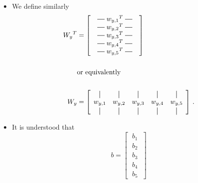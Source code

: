 \documentclass{article}
\newcommand*{\vertbar}{\rule[-1ex]{0.5pt}{2.5ex}}
\newcommand*{\horzbar}{\rule[.5ex]{2.5ex}{0.5pt}}
\begin{document}
\begin{itemize}
  \item We define similarly
    \begin{align*}
      {W_y}^{T} &= \begin{bmatrix}
        \quad\horzbar\;{w_{y,1}}^T{}\;\horzbar\quad \\
        \quad\horzbar\;{w_{y,2}}^T{}\;\horzbar\quad \\
        \quad\horzbar\;{w_{y,3}}^T{}\;\horzbar\quad \\
        \quad\horzbar\;{w_{y,4}}^T{}\;\horzbar\quad \\
        \quad\horzbar\;{w_{y,5}}^T{}\;\horzbar\quad \\
      \end{bmatrix} \\
      \\
      \qquad &{}\text{or equivalently} \\
      \\
      {W_y} &= \begin{bmatrix}
        \;\,\vertbar & \vertbar & \vertbar & \vertbar & \vertbar \;\, \\
        \;\, w_{y,1} & w_{y,2} & w_{y,3} & w_{y,4} & w_{y,5}     \;\, \\
        \;\,\vertbar & \vertbar & \vertbar & \vertbar & \vertbar \;\,
      \end{bmatrix}\,.
    \end{align*}
  \item It is understood that
    $$
    b =
    \begin{bmatrix}
      \;b_1\; \\
      \;b_2\; \\
      \;b_3\; \\
      \;b_4\; \\
      \;b_5\;
    \end{bmatrix}
    $$
\end{itemize}
\end{document}
